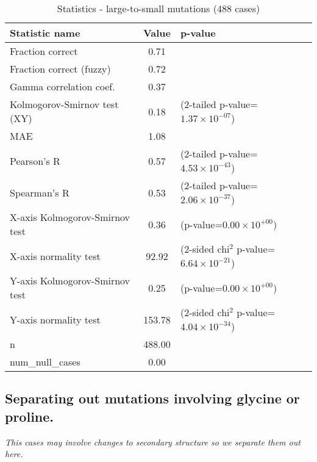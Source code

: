 \documentclass[10pt, letterpaper, oneside, titlepage, landscape]{scrreprt}
\begin{document}
\begin{table}[H]\begin{center}
\begin{tabular}{ l S[table-format=3.2] l}
Statistic name & {Value} & p-value\\
\hline
Fraction correct & 0.71 & \\
Fraction correct (fuzzy) & 0.72 & \\
Gamma correlation coef. & 0.37 & \\
Kolmogorov-Smirnov test (XY) & 0.18 & (2-tailed p-value=$1.37\times10^{-07}$)\\
MAE & 1.08 & \\
Pearson's R & 0.57 & (2-tailed p-value=$4.53\times10^{-43}$)\\
Spearman's R & 0.53 & (2-tailed p-value=$2.06\times10^{-37}$)\\
X-axis Kolmogorov-Smirnov test & 0.36 & (p-value=$0.00\times10^{+00}$)\\
X-axis normality test & 92.92 & (2-sided chi$^{2}$ p-value=$6.64\times10^{-21}$)\\
Y-axis Kolmogorov-Smirnov test & 0.25 & (p-value=$0.00\times10^{+00}$)\\
Y-axis normality test & 153.78 & (2-sided chi$^{2}$ p-value=$4.04\times10^{-34}$)\\
n & 488.00 & \\
num\_null\_cases & 0.00 & \\
\end{tabular}
\caption{Statistics - large-to-small mutations (488 cases)}
\end{center}\end{table}


\subsection{Separating out mutations involving glycine or proline.}
\textit{This cases may involve changes to secondary structure so we separate them out here.}
\end{document}
